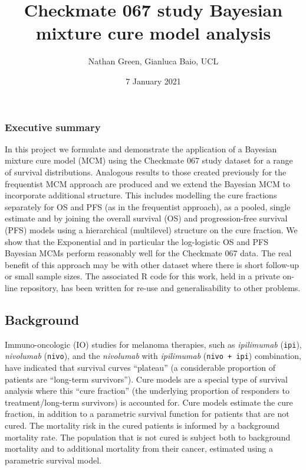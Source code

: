 \documentclass[
]{article}
\title{Checkmate 067 study Bayesian mixture cure model analysis}
\author{Nathan Green, Gianluca Baio, UCL}
\date{7 January 2021}
\begin{document}
\maketitle

\hypertarget{executive-summary}{%
\subsubsection{Executive summary}\label{executive-summary}}

In this project we formulate and demonstrate the application of a
Bayesian mixture cure model (MCM) using the Checkmate 067 study dataset
for a range of survival distributions. Analogous results to those
created previously for the frequentist MCM approach are produced and we
extend the Bayesian MCM to incorporate additional structure. This
includes modelling the cure fractions separately for OS and PFS (as in
the frequentist approach), as a pooled, single estimate and by joining
the overall survival (OS) and progression-free survival (PFS) models
using a hierarchical (multilevel) structure on the cure fraction. We
show that the Exponential and in particular the log-logistic OS and PFS
Bayesian MCMs perform reasonably well for the Checkmate 067 data. The
real benefit of this approach may be with other dataset where there is
short follow-up or small sample sizes. The associated R code for this
work, held in a private on-line repository, has been written for re-use
and generalisability to other problems.

\hypertarget{background}{%
\subsection{Background}\label{background}}

Immuno-oncologic (IO) studies for melanoma therapies, such as
\emph{ipilimumab} (\texttt{ipi}), \emph{nivolumab} (\texttt{nivo}), and
the \emph{nivolumab} with \emph{ipilimumab} (\texttt{nivo\ +\ ipi})
combination, have indicated that survival curves ``plateau'' (a
considerable proportion of patients are ``long-term survivors''). Cure
models are a special type of survival analysis where this ``cure
fraction'' (the underlying proportion of responders to
treatment/long-term survivors) is accounted for. Cure models estimate
the cure fraction, in addition to a parametric survival function for
patients that are not cured. The mortality risk in the cured patients is
informed by a background mortality rate. The population that is not
cured is subject both to background mortality and to additional
mortality from their cancer, estimated using a parametric survival
model.
\end{document}
